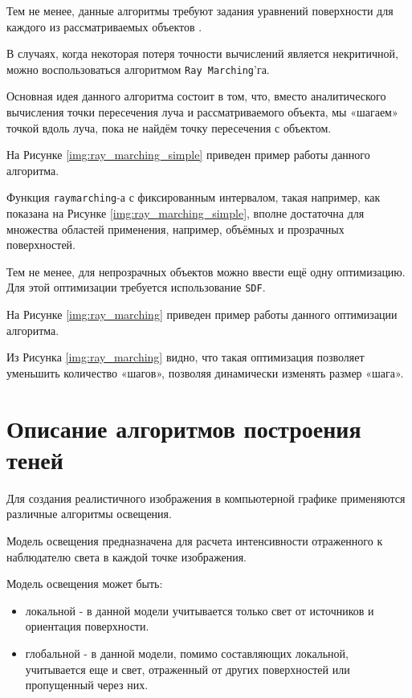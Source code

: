 Тем не менее, данные алгоритмы требуют задания уравнений поверхности для каждого из рассматриваемых объектов . 

В случаях, когда некоторая потеря точности вычислений является некритичной, можно воспользоваться алгоритмом \texttt{Ray Marching}'га. 

Основная идея данного алгоритма состоит в том, что, вместо аналитического вычисления точки пересечения луча и рассматриваемого объекта, мы «шагаем» точкой вдоль луча, пока не найдём точку пересечения с объектом.

На Рисунке \ref{img:ray_marching_simple} приведен пример работы данного алгоритма.


Функция \texttt{raymarching}-а с фиксированным интервалом, такая например, как показана на Рисунке \ref{img:ray_marching_simple}, вполне достаточна для множества областей применения, например, объёмных и прозрачных поверхностей. 

Тем не менее, для непрозрачных объектов можно ввести ещё одну оптимизацию. Для этой оптимизации требуется использование \texttt{SDF}.

На Рисунке \ref{img:ray_marching} приведен пример работы данного оптимизации алгоритма.


Из Рисунка \ref{img:ray_marching} видно, что такая оптимизация позволяет уменьшить количество «шагов», позволяя динамически изменять размер «шага».

\section{Описание алгоритмов построения теней}

Для создания реалистичного изображения в компьютерной графике применяются различные алгоритмы освещения.

Модель освещения предназначена для расчета интенсивности отраженного к наблюдателю света в каждой точке изображения.

Модель освещения может быть:
\begin{itemize}
    \item локальной - в данной модели учитывается только свет от источников и ориентация поверхности.
    \item глобальной - в данной модели, помимо составляющих локальной, учитывается еще и свет, отраженный от других поверхностей или пропущенный через них.
\end{itemize}

